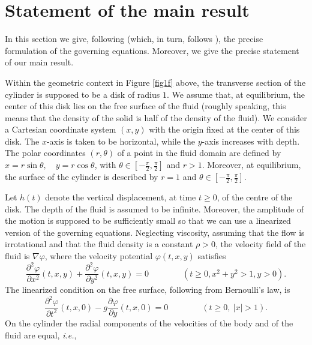 \documentclass{amsart} %
\numberwithin{equation}{section}
\theoremstyle{definition}
\begin{document}
\section{Statement of the main result}\label{sec_statement}
In this section we give, following  \cite{ursell_1964_decay} (which, in turn, follows  \cite{john1949motion}), the precise formulation of the governing equations. Moreover, we give the precise statement of our main result. 

Within the geometric context in  Figure \ref{fig1f} above, the transverse section of the cylinder is supposed to be a disk of radius $1$. 
We assume that, at equilibrium, the center of this disk lies on the free surface of the fluid (roughly speaking, this means that the density of the solid is half of the density of the fluid).
We consider a Cartesian coordinate system $(x, y)$ with the origin fixed at the center of this disk.  
The $x$-axis is taken to be horizontal, while the $y$-axis increases with depth. The polar coordinates $(r, \theta)$ of a point in the fluid domain are defined by $x = r \sin \theta, \quad y = r \cos \theta$, with $\theta\in \left[-\frac{\pi}{2},\frac{\pi}{2}\right]$ and $r>1$. Moreover, at equilibrium, the surface of the cylinder is described by $r = 1$ and $\theta\in \left[-\frac{\pi}{2},\frac{\pi}{2}\right]$. 

 

Let $h(t)$ denote the vertical displacement, at time $t\geqslant 0$, of the centre of the disk. The depth of the fluid is assumed to be infinite. Moreover, the amplitude of the motion is supposed to be sufficiently small so that we can use a linearized version of the governing equations. Neglecting viscosity, assuming that the flow is irrotational and that the fluid density is a constant $\rho>0$, the velocity field of the fluid is $\nabla\varphi$, where the velocity potential $\varphi(t, x, y)$ satisfies 
\begin{equation}\label{2.1}
\frac{\partial^2\varphi}{\partial x^2}(t,x,y) +
\frac{\partial^2\varphi}{\partial y^2}(t,x,y) =0 \qquad\qquad(t\geqslant 0, x^2+y^2>1, y>0).
\end{equation}
The linearized condition on the free surface, following from Bernoulli's law, is
\begin{equation}\label{2.2}
\frac{\partial^2\varphi}{\partial t^2}(t,x,0)-g \frac{\partial\varphi}{\partial y}(t,x,0)=0
\qquad\qquad(t\geqslant 0,\ |x|>1).
\end{equation}
On the cylinder the radial  components of the velocities
of the body and of the fluid are equal, {\it i.e.},
\end{document}

